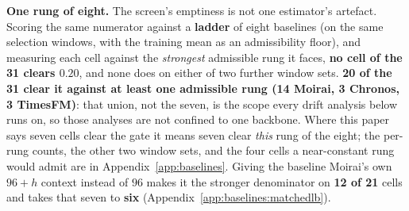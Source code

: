 \textbf{One rung of eight.}  The screen's emptiness is not one estimator's
artefact.  Scoring the same numerator against a \textbf{ladder} of eight
baselines (on the same selection windows, with the training mean as an
admissibility floor), and measuring each cell against the \emph{strongest}
admissible rung it faces, \textbf{no cell of the 31 clears $0.20$}, and none does
on either of two further window sets.  \textbf{20 of the 31 clear it against at
least one admissible rung (14 Moirai, 3 Chronos, 3 TimesFM)}: that union, not the
seven, is the scope every drift analysis below runs on, so those analyses are not
confined to one backbone.  Where this paper says seven cells clear the gate it
means seven clear \emph{this} rung of the eight; the per-rung counts, the other
two window sets, and the four cells a near-constant rung would admit are in
Appendix~\ref{app:baselines}.  Giving the baseline Moirai's own $96{+}h$ context
instead of $96$ makes it the stronger denominator on \textbf{12 of 21} cells and
takes that seven to \textbf{six} (Appendix~\ref{app:baselines:matchedlb}).
